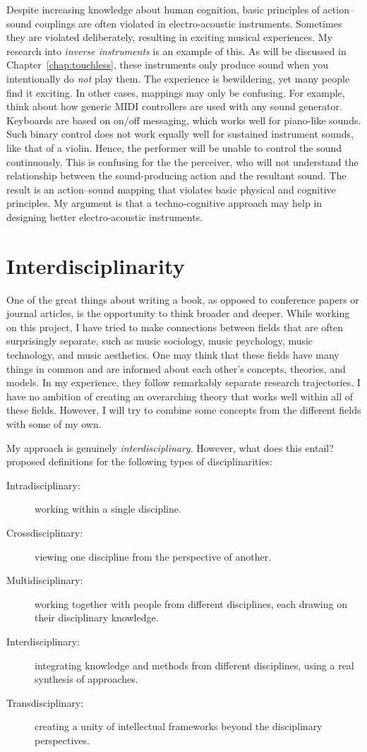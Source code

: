 Despite increasing knowledge about human cognition, basic principles of action--sound couplings are often violated in electro-acoustic instruments. Sometimes they are violated deliberately, resulting in exciting musical experiences. My research into \emph{inverse instruments} is an example of this. As will be discussed in Chapter~\ref{chap:touchless}, these instruments only produce sound when you intentionally do \emph{not} play them. The experience is bewildering, yet many people find it exciting. In other cases, mappings may only be confusing. For example, think about how generic MIDI controllers are used with any sound generator. Keyboards are based on on/off messaging, which works well for piano-like sounds. Such binary control does not work equally well for sustained instrument sounds, like that of a violin. Hence, the performer will be unable to control the sound continuously. This is confusing for the the perceiver, who will not understand the relationship between the sound-producing action and the resultant sound. The result is an action--sound mapping that violates basic physical and cognitive principles. My argument is that a techno-cognitive approach may help in designing better electro-acoustic instruments.


\section{Interdisciplinarity}

One of the great things about writing a book, as opposed to conference papers or journal articles, is the opportunity to think broader and deeper. While working on this project, I have tried to make connections between fields that are often surprisingly separate, such as music sociology, music psychology, music technology, and music aesthetics. One may think that these fields have many things in common and are informed about each other's concepts, theories, and models. In my experience, they follow remarkably separate research trajectories. I have no ambition of creating an overarching theory that works well within all of these fields. However, I will try to combine some concepts from the different fields with some of my own.

My approach is genuinely \emph{interdisciplinary}. However, what does this entail? \citet{stember_advancing_1991} proposed definitions for the following types of disciplinarities:

\begin{description}
    \item[Intradisciplinary:] working within a single discipline.
    \item[Crossdisciplinary:] viewing one discipline from the perspective of another.
    \item[Multidisciplinary:] working together with people from different disciplines, each drawing on their disciplinary knowledge.
    \item[Interdisciplinary:] integrating knowledge and methods from different disciplines, using a real synthesis of approaches.
    \item[Transdisciplinary:] creating a unity of intellectual frameworks beyond the disciplinary perspectives.
\end{description}

